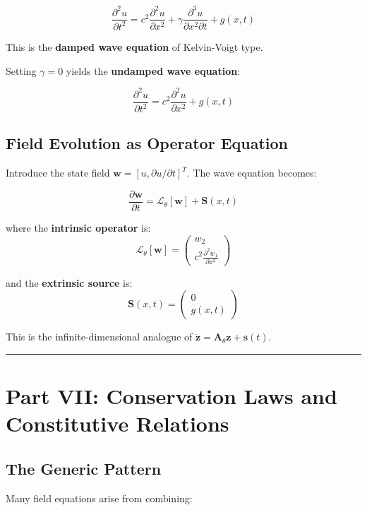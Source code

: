 \documentclass[
]{article}
\begin{document}
\[\frac{\partial^2 u}{\partial t^2} = c^2 \frac{\partial^2 u}{\partial x^2} + \gamma \frac{\partial^3 u}{\partial x^2 \partial t} + g(x,t)\]

This is the \textbf{damped wave equation} of Kelvin-Voigt type.

Setting \(\gamma = 0\) yields the \textbf{undamped wave equation}:

\[\frac{\partial^2 u}{\partial t^2} = c^2 \frac{\partial^2 u}{\partial x^2} + g(x,t)\]

\subsection{Field Evolution as Operator
Equation}\label{field-evolution-as-operator-equation}

Introduce the state field \(\mathbf{w} = [u, \partial u/\partial t]^T\).
The wave equation becomes:

\[\frac{\partial \mathbf{w}}{\partial t} = \mathcal{L}_\theta[\mathbf{w}] + \mathbf{S}(x,t)\]

where the \textbf{intrinsic operator} is:
\[\mathcal{L}_\theta[\mathbf{w}] = \begin{pmatrix} w_2 \\ c^2 \frac{\partial^2 w_1}{\partial x^2} \end{pmatrix}\]

and the \textbf{extrinsic source} is:
\[\mathbf{S}(x,t) = \begin{pmatrix} 0 \\ g(x,t) \end{pmatrix}\]

This is the infinite-dimensional analogue of
\(\dot{\mathbf{z}} = \mathbf{A}_\theta \mathbf{z} + \mathbf{s}(t)\).

\begin{center}\rule{0.5\linewidth}{0.5pt}\end{center}

\section{Part VII: Conservation Laws and Constitutive
Relations}\label{part-vii-conservation-laws-and-constitutive-relations}

\subsection{The Generic Pattern}\label{the-generic-pattern}

Many field equations arise from combining:
\end{document}
